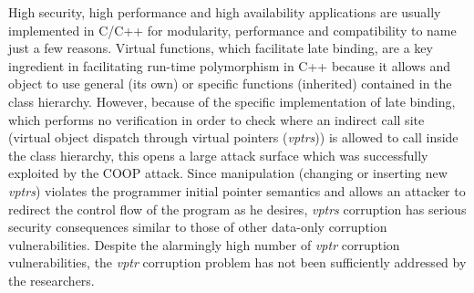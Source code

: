
% 



High security, high performance and high availability 
applications are usually implemented in C/C++ for modularity, 
performance and compatibility to name just a few reasons.
Virtual functions, which facilitate late binding,
are a key ingredient in facilitating run-time polymorphism
in C++ because it allows and object to use general (its own) 
or specific functions (inherited) contained in the class hierarchy.
However, because of the specific implementation of late binding,
which performs no verification in order to check where an indirect call site 
(virtual object dispatch through virtual pointers (\textit{vptrs})) is allowed to
call inside the class hierarchy, this opens a large attack surface which
was successfully exploited by the COOP attack.
Since manipulation (changing or inserting new \textit{vptrs}) violates the 
programmer initial pointer semantics and allows an attacker to
redirect the control flow of the program as he desires, \textit{vptrs} corruption
has serious security consequences similar to those of other 
data-only corruption vulnerabilities.
Despite the alarmingly high number of \textit{vptr} corruption
vulnerabilities, the \textit{vptr} corruption problem has not
been sufficiently addressed by the researchers.

